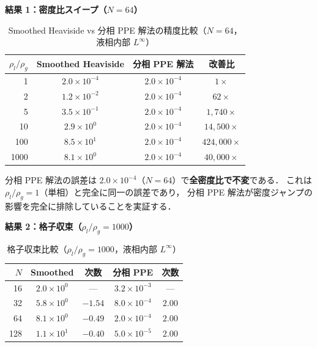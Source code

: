 \noindent\textbf{結果 1：密度比スイープ（$N = 64$）}

\begin{table}[htbp]
\centering
\caption{Smoothed Heaviside vs 分相 PPE 解法の精度比較（$N = 64$，液相内部 $L^\infty$）}
\label{tab:gfm_vs_smoothed}
\renewcommand{\arraystretch}{1.3}
\begin{tabular}{rccc}
\toprule
$\rho_l/\rho_g$ & Smoothed Heaviside & 分相 PPE 解法 & 改善比 \\
\midrule
   1 & $2.0 \times 10^{-4}$ & $2.0 \times 10^{-4}$ & $1\times$ \\
   2 & $1.2 \times 10^{-2}$ & $2.0 \times 10^{-4}$ & $62\times$ \\
   5 & $3.5 \times 10^{-1}$ & $2.0 \times 10^{-4}$ & $1{,}740\times$ \\
  10 & $2.9 \times 10^{0}$  & $2.0 \times 10^{-4}$ & $14{,}500\times$ \\
 100 & $8.5 \times 10^{1}$  & $2.0 \times 10^{-4}$ & $424{,}000\times$ \\
1000 & $8.1 \times 10^{0}$  & $2.0 \times 10^{-4}$ & $40{,}000\times$ \\
\bottomrule
\end{tabular}
\end{table}

分相 PPE 解法の誤差は $2.0 \times 10^{-4}$（$N = 64$）で\textbf{全密度比で不変}である．
これは $\rho_l/\rho_g = 1$（単相）と完全に同一の誤差であり，
分相 PPE 解法が密度ジャンプの影響を完全に排除していることを実証する．

\noindent\textbf{結果 2：格子収束（$\rho_l/\rho_g = 1000$）}

\begin{table}[htbp]
\centering
\caption{格子収束比較（$\rho_l/\rho_g = 1000$，液相内部 $L^\infty$）}
\label{tab:gfm_convergence}
\renewcommand{\arraystretch}{1.3}
\begin{tabular}{rcccc}
\toprule
$N$ & Smoothed & 次数 & 分相 PPE & 次数 \\
\midrule
  16 & $2.0 \times 10^{0}$ & ---     & $3.2 \times 10^{-3}$ & --- \\
  32 & $5.8 \times 10^{0}$ & $-1.54$ & $8.0 \times 10^{-4}$ & $2.00$ \\
  64 & $8.1 \times 10^{0}$ & $-0.49$ & $2.0 \times 10^{-4}$ & $2.00$ \\
 128 & $1.1 \times 10^{1}$ & $-0.40$ & $5.0 \times 10^{-5}$ & $2.00$ \\
\bottomrule
\end{tabular}
\end{table}

